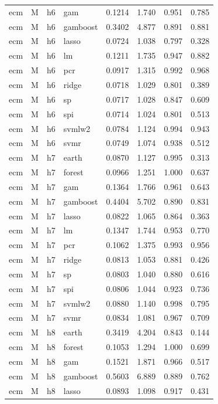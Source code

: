 \begin{ThreePartTable}
\begin{longtable}[t]{llclcccc}
ecm & M & h6 & gam & 0.1214 & 1.740 & 0.951 & 0.785\\
ecm & M & h6 & gamboost & 0.3402 & 4.877 & 0.891 & 0.881\\
ecm & M & h6 & lasso & 0.0724 & 1.038 & 0.797 & 0.328\\
ecm & M & h6 & lm & 0.1211 & 1.735 & 0.947 & 0.882\\
ecm & M & h6 & pcr & 0.0917 & 1.315 & 0.992 & 0.968\\
ecm & M & h6 & ridge & 0.0718 & 1.029 & 0.801 & 0.389\\
ecm & M & h6 & sp & 0.0717 & 1.028 & 0.847 & 0.609\\
ecm & M & h6 & spi & 0.0714 & 1.024 & 0.801 & 0.513\\
ecm & M & h6 & svmlw2 & 0.0784 & 1.124 & 0.994 & 0.943\\
ecm & M & h6 & svmr & 0.0749 & 1.074 & 0.938 & 0.512\\
\addlinespace
ecm & M & h7 & earth & 0.0870 & 1.127 & 0.995 & 0.313\\
ecm & M & h7 & forest & 0.0966 & 1.251 & 1.000 & 0.637\\
ecm & M & h7 & gam & 0.1364 & 1.766 & 0.961 & 0.643\\
ecm & M & h7 & gamboost & 0.4404 & 5.702 & 0.890 & 0.831\\
ecm & M & h7 & lasso & 0.0822 & 1.065 & 0.864 & 0.363\\
ecm & M & h7 & lm & 0.1347 & 1.744 & 0.953 & 0.770\\
ecm & M & h7 & pcr & 0.1062 & 1.375 & 0.993 & 0.956\\
ecm & M & h7 & ridge & 0.0813 & 1.053 & 0.881 & 0.426\\
ecm & M & h7 & sp & 0.0803 & 1.040 & 0.880 & 0.616\\
ecm & M & h7 & spi & 0.0806 & 1.044 & 0.923 & 0.736\\
ecm & M & h7 & svmlw2 & 0.0880 & 1.140 & 0.998 & 0.795\\
ecm & M & h7 & svmr & 0.0834 & 1.081 & 0.967 & 0.709\\
\addlinespace
ecm & M & h8 & earth & 0.3419 & 4.204 & 0.843 & 0.144\\
ecm & M & h8 & forest & 0.1053 & 1.294 & 1.000 & 0.699\\
ecm & M & h8 & gam & 0.1521 & 1.871 & 0.966 & 0.517\\
ecm & M & h8 & gamboost & 0.5603 & 6.889 & 0.889 & 0.762\\
ecm & M & h8 & lasso & 0.0893 & 1.098 & 0.917 & 0.431\\

\end{longtable}
\end{ThreePartTable}
